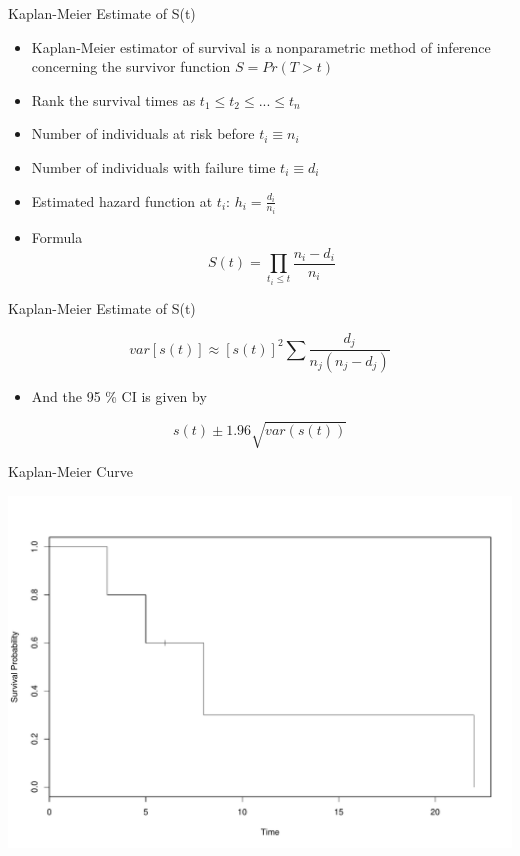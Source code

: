 \documentclass[ignorenonframetext,]{beamer}
\begin{document}
\begin{frame}{Kaplan-Meier Estimate of S(t)}

\begin{itemize}
\item
  Kaplan-Meier estimator of survival is a nonparametric method of
  inference concerning the survivor function \(S = Pr(T > t)\)
\item
  Rank the survival times as \(t_1 \leq t_2 \leq ... \leq t_n\)
\item
  Number of individuals at risk before \(t_i \equiv n_i\)
\item
  Number of individuals with failure time \(t_i \equiv d_i\)
\item
  Estimated hazard function at \(t_i\): \(h_i=\frac{d_i}{n_i}\)
\item
  Formula \[
  S(t) = \prod_{t_i \leq t} \frac{n_i - d_i}{n_i}
  \]
\end{itemize}

\end{frame}

\begin{frame}{Kaplan-Meier Estimate of S(t)}

\[
var[s(t)]\approx [s(t)]^2\sum \frac{d_j}{n_j(n_j-d_j)}
\]

\begin{itemize}
\itemsep1pt\parskip0pt
\item
  And the 95 \% CI is given by
\end{itemize}

\[
s(t)\pm 1.96 \sqrt{var(s(t))}
\]

\end{frame}

\begin{frame}{Kaplan-Meier Curve}

\includegraphics{survival_analysis_files/figure-beamer/unnamed-chunk-1-1.pdf}

\end{frame}
\end{document}

